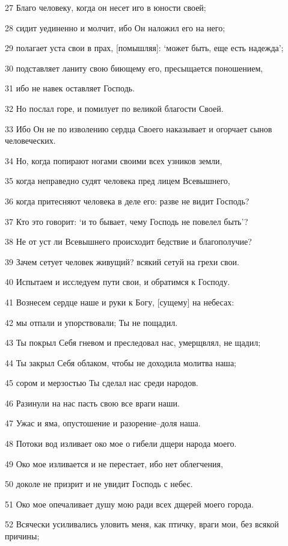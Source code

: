 \par 27 Благо человеку, когда он несет иго в юности своей;
\par 28 сидит уединенно и молчит, ибо Он наложил его на него;
\par 29 полагает уста свои в прах, [помышляя]: `может быть, еще есть надежда';
\par 30 подставляет ланиту свою биющему его, пресыщается поношением,
\par 31 ибо не навек оставляет Господь.
\par 32 Но послал горе, и помилует по великой благости Своей.
\par 33 Ибо Он не по изволению сердца Своего наказывает и огорчает сынов человеческих.
\par 34 Но, когда попирают ногами своими всех узников земли,
\par 35 когда неправедно судят человека пред лицем Всевышнего,
\par 36 когда притесняют человека в деле его: разве не видит Господь?
\par 37 Кто это говорит: `и то бывает, чему Господь не повелел быть'?
\par 38 Не от уст ли Всевышнего происходит бедствие и благополучие?
\par 39 Зачем сетует человек живущий? всякий сетуй на грехи свои.
\par 40 Испытаем и исследуем пути свои, и обратимся к Господу.
\par 41 Вознесем сердце наше и руки к Богу, [сущему] на небесах:
\par 42 мы отпали и упорствовали; Ты не пощадил.
\par 43 Ты покрыл Себя гневом и преследовал нас, умерщвлял, не щадил;
\par 44 Ты закрыл Себя облаком, чтобы не доходила молитва наша;
\par 45 сором и мерзостью Ты сделал нас среди народов.
\par 46 Разинули на нас пасть свою все враги наши.
\par 47 Ужас и яма, опустошение и разорение--доля наша.
\par 48 Потоки вод изливает око мое о гибели дщери народа моего.
\par 49 Око мое изливается и не перестает, ибо нет облегчения,
\par 50 доколе не призрит и не увидит Господь с небес.
\par 51 Око мое опечаливает душу мою ради всех дщерей моего города.
\par 52 Всячески усиливались уловить меня, как птичку, враги мои, без всякой причины;
